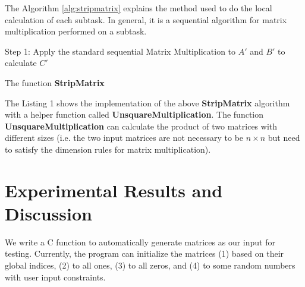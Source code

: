 \documentclass[conference]{IEEEtran}
\begin{document}
 
The Algorithm \ref{alg:stripmatrix} explains the method used to do the local calculation of each subtask. In general, it is a sequential algorithm for matrix multiplication performed on a subtask.\\

\begin{algorithm}[!htb]
\SetAlgoLined
{}
 \Begin
  {Step 1: Apply the standard sequential Matrix Multiplication to $A'$ and $B'$ to calculate $C'$
  }
 \caption{ The function \textbf{StripMatrix}}
 \label{alg:stripmatrix}
\end{algorithm}

The Listing 1 shows the implementation of the above \textbf{StripMatrix} algorithm with a helper function called \textbf{UnsquareMultiplication}. The function \textbf{UnsquareMultiplication} can calculate the product of two matrices with different sizes (i.e. the two input matrices are not necessary to be $n \times n$ but need to satisfy the dimension rules for matrix multiplication). 
\lstset{ basicstyle=\footnotesize,breakatwhitespace=false,breaklines=true, tabsize = 2}



\section{Experimental Results and Discussion}\label{results}
We write a C function to automatically generate matrices as our input for testing. Currently, the program can initialize the matrices (1) based on their global indices, (2) to all ones, (3) to all zeros, and (4) to some random numbers with user input constraints. 
\end{document}
